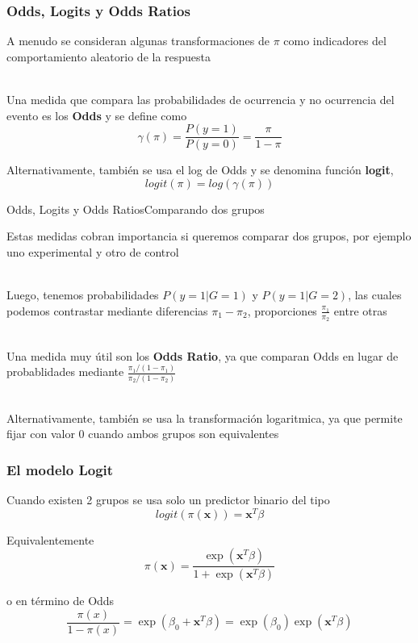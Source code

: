 \documentclass[]{beamer}
\begin{document}
\begin{frame}
    \frametitle{Odds, Logits y Odds Ratios}

    A menudo se consideran algunas transformaciones de $\pi$ como indicadores del 
    comportamiento aleatorio de la respuesta\\~\ 

    Una medida que compara las probabilidades de ocurrencia y no ocurrencia del evento 
    es los \textbf{Odds} y se define como $$\gamma(\pi)=\frac{P(y=1)}{P(y=0)}=\frac{\pi}{1-\pi }$$

    Alternativamente, también se usa el log de Odds y se denomina función \textbf{logit},
    $$logit\left(\pi \right)=log(\gamma(\pi))$$

\end{frame}

\begin{frame}{Odds, Logits y Odds Ratios}{Comparando dos grupos}
    
    Estas medidas cobran importancia si queremos comparar dos grupos, por ejemplo uno
    experimental y otro de control \\~\ 
    
    Luego, tenemos probabilidades $P(y=1|G=1)$ y $P(y=1|G=2)$, las cuales podemos contrastar
    mediante diferencias $\pi_1-\pi_2$, proporciones $\frac{\pi_1}{\pi_2}$ entre otras \\~\ 
    
    Una medida muy útil son los \textbf{Odds Ratio}, ya que comparan Odds en lugar de 
    probablidades mediante  $\frac{\pi_1/(1-\pi_1)}{\pi_2/(1-\pi_2)}$ \\~\  
    
    Alternativamente, también se usa la transformación
    logaritmica, ya que permite fijar con valor $0$ cuando ambos grupos son equivalentes  
    
\end{frame}

\begin{frame}
    \frametitle{El modelo Logit}

    Cuando existen 2 grupos se usa solo un predictor binario del tipo
    $$logit(\pi(\mathbf{x}))=\mathbf{x}^T\beta $$
    
    Equivalentemente     
    $$\pi(\mathbf{x})=\frac{\exp (\mathbf{x}^T\beta)}{1+\exp(\mathbf{x}^T\beta)}$$

    o en término de Odds
    $$\frac{\pi(x)}{1-\pi(x)}=\exp(\beta_0+\mathbf{x}^T\beta)=\exp(\beta_0)\exp(\mathbf{x}^T\beta)$$


\end{frame}
\end{document}
